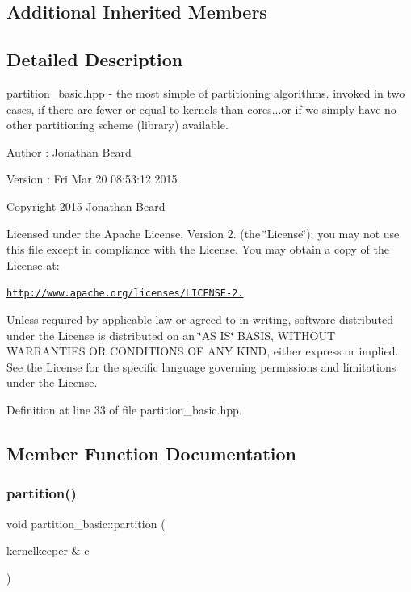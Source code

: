 \subsection*{Additional Inherited Members}


\subsection{Detailed Description}
\hyperlink{partition__basic_8hpp_source}{partition\+\_\+basic.\+hpp} -\/ the most simple of partitioning algorithms. invoked in two cases, if there are fewer or equal to kernels than cores...or if we simply have no other partitioning scheme (library) available.

\begin{DoxyAuthor}{Author}
\+: Jonathan Beard 
\end{DoxyAuthor}
\begin{DoxyVersion}{Version}
\+: Fri Mar 20 08\+:53\+:12 2015
\end{DoxyVersion}
Copyright 2015 Jonathan Beard

Licensed under the Apache License, Version 2. (the \char`\"{}\+License\char`\"{}); you may not use this file except in compliance with the License. You may obtain a copy of the License at\+:

\href{http://www.apache.org/licenses/LICENSE-2.0}{\tt http\+://www.\+apache.\+org/licenses/\+L\+I\+C\+E\+N\+S\+E-\/2.}

Unless required by applicable law or agreed to in writing, software distributed under the License is distributed on an \char`\"{}\+A\+S I\+S\char`\"{} B\+A\+S\+IS, W\+I\+T\+H\+O\+UT W\+A\+R\+R\+A\+N\+T\+I\+ES OR C\+O\+N\+D\+I\+T\+I\+O\+NS OF A\+NY K\+I\+ND, either express or implied. See the License for the specific language governing permissions and limitations under the License. 

Definition at line 33 of file partition\+\_\+basic.\+hpp.



\subsection{Member Function Documentation}
\hypertarget{classpartition__basic_a3dc4106326788887f9a7c6ac49bb46d4}{}\label{classpartition__basic_a3dc4106326788887f9a7c6ac49bb46d4} 
\subsubsection{\texorpdfstring{partition()}{partition()}}
{\footnotesize\ttfamily void partition\+\_\+basic\+::partition (\begin{DoxyParamCaption}\item[{kernelkeeper \&}]{c }\end{DoxyParamCaption})\hspace{0.3cm}{\ttfamily [virtual]}}

